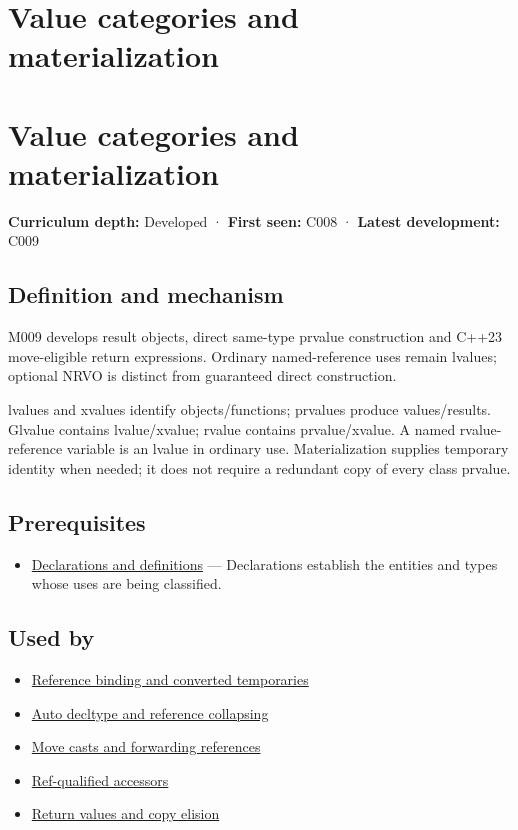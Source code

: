 \hypertarget{appendix-1121b30eaeb0}{}
\section*{Value categories and materialization}
\section{Value categories and materialization}\label{appendix-1121b30eaeb0-value-categories-and-materialization}

\textbf{Curriculum depth:} Developed · \textbf{First seen:} C008 · \textbf{Latest development:} C009

\subsection{Definition and mechanism}\label{appendix-1121b30eaeb0-definition-and-mechanism}

M009 develops result objects, direct same-type prvalue construction and C++23 move-eligible return expressions. Ordinary named-reference uses remain lvalues; optional NRVO is distinct from guaranteed direct construction.

lvalues and xvalues identify objects/functions; prvalues produce values/results. Glvalue contains lvalue/xvalue; rvalue contains prvalue/xvalue. A named rvalue-reference variable is an lvalue in ordinary use. Materialization supplies temporary identity when needed; it does not require a redundant copy of every class prvalue.

\subsection{Prerequisites}\label{appendix-1121b30eaeb0-prerequisites}

\begin{itemize}
\tightlist
\item
  \hyperref[appendix-2e4d494c2d94]{Declarations and definitions} --- Declarations establish the entities and types whose uses are being classified.
\end{itemize}

\subsection{Used by}\label{appendix-1121b30eaeb0-used-by}

\begin{itemize}
\tightlist
\item
  \hyperref[appendix-37856d997bb0]{Reference binding and converted temporaries}
\item
  \hyperref[appendix-5d4252a42886]{Auto decltype and reference collapsing}
\item
  \hyperref[appendix-0104b704fb11]{Move casts and forwarding references}
\item
  \hyperref[appendix-d42039b1d6f7]{Ref-qualified accessors}
\item
  \hyperref[appendix-b08d3788c5c6]{Return values and copy elision}
\end{itemize}

